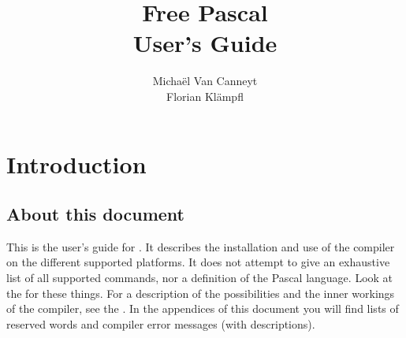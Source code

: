%
%
%
%
%

\begin{latexonly}
  \ifpdf
  \fi
\end{latexonly}

%
%
\makeindex
%
%

\title{Free Pascal\\ User's Guide}

\author{Micha\"el Van Canneyt\\Florian Kl\"ampfl}
\maketitle
\tableofcontents

\chapter{Introduction}

\section{About this document}
This is the user's guide for \fpc . It describes the installation and
use of the \fpc compiler on the different supported platforms.
It does not attempt to give an exhaustive list of all supported commands,
nor a definition of the Pascal language. Look at the
 for these things. For a description of the possibilities and the 
inner workings of the compiler, see the
\progref . In the appendices of this document you will find lists of
reserved words and compiler error messages (with descriptions).

